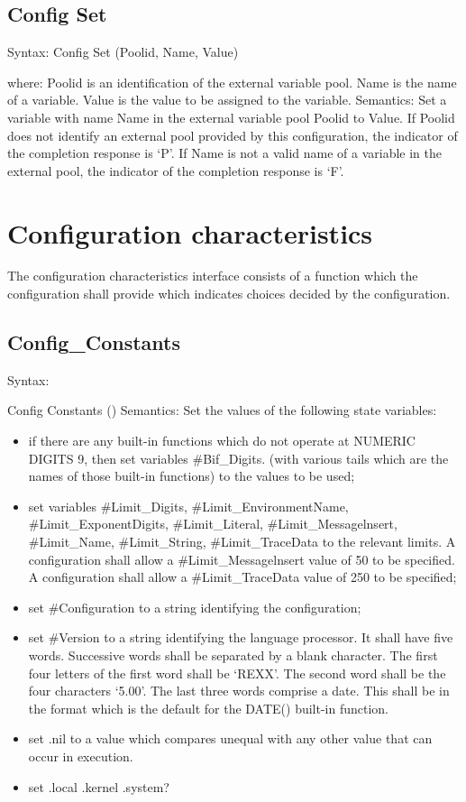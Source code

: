 \subsection{Config Set}\label{config-set}

Syntax: Config Set (Poolid, Name, Value)

where: Poolid is an identification of the external variable pool. Name
is the name of a variable. Value is the value to be assigned to the
variable. Semantics: Set a variable with name Name in the external
variable pool Poolid to Value. If Poolid does not identify an external
pool provided by this configuration, the indicator of the completion
response is `P'. If Name is not a valid name of a variable in the
external pool, the indicator of the completion response is `F'.

\section{Configuration
characteristics}\label{configuration-characteristics}

The configuration characteristics interface consists of a function which
the configuration shall provide which indicates choices decided by the
configuration.

\subsection{Config\_Constants}\label{config_constants}

Syntax:

Config Constants () Semantics: Set the values of the following state
variables:

\begin{itemize}
\item
  if there are any built-in functions which do not operate at NUMERIC
  DIGITS 9, then set variables \#Bif\_Digits. (with various tails which
  are the names of those built-in functions) to the values to be used;
\item
  set variables \#Limit\_Digits, \#Limit\_EnvironmentName,
  \#Limit\_ExponentDigits, \#Limit\_Literal, \#Limit\_Messagelnsert,
  \#Limit\_Name, \#Limit\_String, \#Limit\_TraceData to the relevant
  limits. A configuration shall allow a \#Limit\_Messagelnsert value of
  50 to be specified. A configuration shall allow a \#Limit\_TraceData
  value of 250 to be specified;
\item
  set \#Configuration to a string identifying the configuration;
\item
  set \#Version to a string identifying the language processor. It shall
  have five words. Successive words shall be separated by a blank
  character. The first four letters of the first word shall be `REXX'.
  The second word shall be the four characters `5.00'. The last three
  words comprise a date. This shall be in the format which is the
  default for the DATE() built-in function.
\item
  set .nil to a value which compares unequal with any other value that
  can occur in execution.
\item
  set .local .kernel .system?
\end{itemize}


